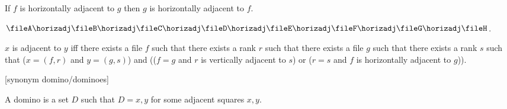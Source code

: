 \begin{forthel}
    \begin{axiom}
        If $f$ is horizontally adjacent to $g$ then $g$ is horizontally adjacent to $f$.
    \end{axiom}
    \begin{axiom}
        $\fileA \horizadj \fileB \horizadj \fileC \horizadj \fileD
        \horizadj \fileE \horizadj \fileF \horizadj \fileG \horizadj \fileH$.
    \end{axiom}



    \begin{definition}[Adjacency]
        $x$ is adjacent to $y$ iff
        there exists a file $f$ such that
        there exists a rank $r$ such that
        there exists a file $g$ such that
        there exists a rank $s$ such that
        ($x=(f,r)$ and $y=(g,s)$) and (($f=g$ and $r$ is vertically adjacent to $s$) or
        ($r=s$ and $f$ is horizontally adjacent to $g$)).
    \end{definition}

    [synonym domino/dominoes]
    \begin{definition}
        A domino is a set $D$ such that $D = {x,y}$ for some
        adjacent squares $x, y$.
    \end{definition}
\end{forthel}



